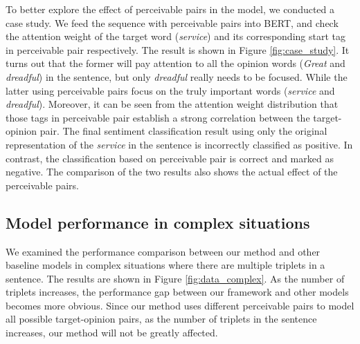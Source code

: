 \documentclass[11pt]{article}
\begin{document}
\begin{table}[t]
    \centering
    
    
    \caption{Performance comparison in complex situations with one-to-many correspondence. All the models mentioned in this table use BERT as the encoder. Due to limited space, we only list the results of two datasets. Similar results can be seen on other datasets.}
    \label{tab:ont_to_many}
    
\end{table}
To better explore the effect of perceivable pairs in the model, we conducted a case study. We feed the sequence with perceivable pairs into BERT, and check the attention weight of the target word (\textit{service}) and its corresponding start tag in perceivable pair respectively. 
The result is shown in Figure \ref{fig:case_study}. It turns out that the former will pay attention to all the opinion words (\textit{Great} and \textit{dreadful}) in the sentence, but only \textit{dreadful} really needs to be focused. While the latter using perceivable pairs focus on the truly important words (\textit{service} and \textit{dreadful}). 
Moreover, it can be seen from the attention weight distribution that those tags in perceivable pair establish a strong correlation between the target-opinion pair.
The final sentiment classification result using only the original 
representation of the \textit{service} in the sentence is incorrectly classified as positive. In contrast, the classification based on perceivable pair is correct and marked as negative. 
The comparison of the two results also shows the actual effect of the perceivable pairs.
\subsection{Model performance in complex situations}
We examined the performance comparison between our method and other baseline models in complex situations where there are multiple triplets in a sentence. The results are shown in Figure \ref{fig:data_complex}. As the number of triplets increases, the performance gap between our framework and other models becomes more obvious. Since our method uses different perceivable pairs to model all possible target-opinion pairs, as the number of triplets in the sentence increases, our method will not be greatly affected.
\end{document}
